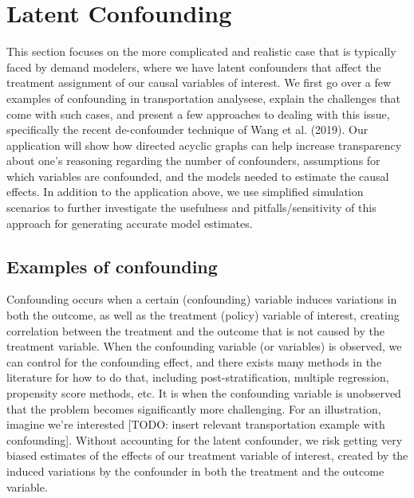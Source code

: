 \section{Latent Confounding}

This section focuses on the more complicated and realistic case that is 
typically faced by demand modelers, where we have latent confounders that 
affect the treatment assignment of our causal variables of interest. We first
go over a few examples of confounding in transportation analysese, explain 
the challenges that come with such cases, and present a few approaches to 
dealing with this issue, specifically the recent de-confounder technique of 
Wang et al. (2019). Our application will show how directed acyclic graphs can 
help increase transparency about one's reasoning regarding the number of 
confounders, assumptions for which variables are confounded, and the models 
needed to estimate the causal effects. In addition to the application above, 
we use simplified simulation scenarios to further investigate the usefulness 
and pitfalls/sensitivity of this approach for generating accurate model 
estimates. 


\subsection{Examples of confounding}


Confounding occurs when a certain (confounding) variable induces variations in
both the outcome, as well as the treatment (policy) variable of interest, 
creating correlation between the treatment and the outcome that is not caused
by the treatment variable. When the confounding variable (or variables) is 
observed, we can control for the confounding effect, and there exists many 
methods in the literature for how to do that, including post-stratification,
multiple regression, propensity score methods, etc. It is when the 
confounding variable is unobserved that the problem becomes significantly 
more challenging. For an illustration, imagine we're interested [TODO: 
insert relevant transportation example with confounding]. Without 
accounting for the latent confounder, we risk getting very biased estimates 
of the effects of our treatment variable of interest, created by the 
induced variations by the confounder in both the treatment and the outcome 
variable. 



